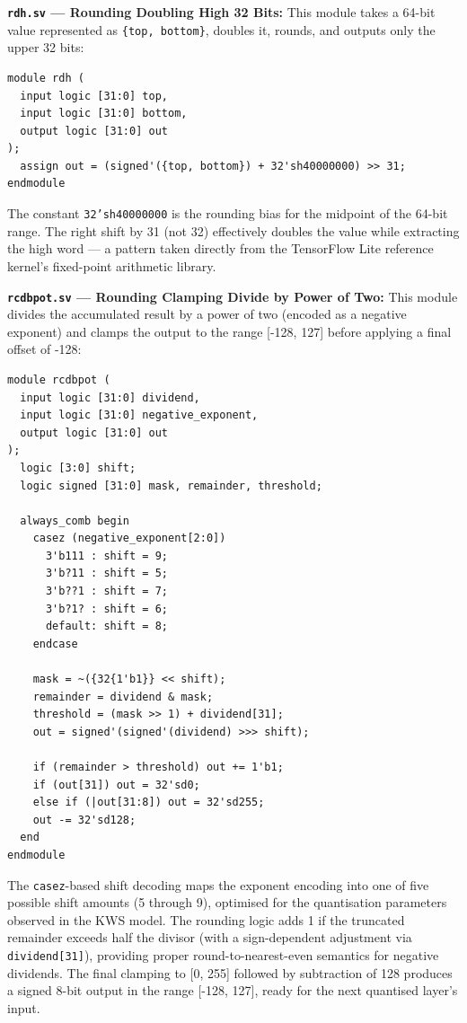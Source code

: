 \textbf{\texttt{rdh.sv} — Rounding Doubling High 32 Bits:} This module takes a 64-bit value represented as \texttt{\{top, bottom\}}, doubles it, rounds, and outputs only the upper 32 bits:

\begin{lstlisting}[style=mystyle]
module rdh (
  input logic [31:0] top,
  input logic [31:0] bottom,
  output logic [31:0] out
);
  assign out = (signed'({top, bottom}) + 32'sh40000000) >> 31;
endmodule
\end{lstlisting}

The constant \texttt{32'sh40000000} is the rounding bias for the midpoint of the 64-bit range. The right shift by 31 (not 32) effectively doubles the value while extracting the high word — a pattern taken directly from the TensorFlow Lite reference kernel's fixed-point arithmetic library.

\textbf{\texttt{rcdbpot.sv} — Rounding Clamping Divide by Power of Two:} This module divides the accumulated result by a power of two (encoded as a negative exponent) and clamps the output to the range [-128, 127] before applying a final offset of -128:

\begin{lstlisting}[style=mystyle]
module rcdbpot (
  input logic [31:0] dividend,
  input logic [31:0] negative_exponent,
  output logic [31:0] out
);
  logic [3:0] shift;
  logic signed [31:0] mask, remainder, threshold;

  always_comb begin
    casez (negative_exponent[2:0])
      3'b111 : shift = 9;
      3'b?11 : shift = 5;
      3'b??1 : shift = 7;
      3'b?1? : shift = 6;
      default: shift = 8;
    endcase

    mask = ~({32{1'b1}} << shift);
    remainder = dividend & mask;
    threshold = (mask >> 1) + dividend[31];
    out = signed'(signed'(dividend) >>> shift);

    if (remainder > threshold) out += 1'b1;
    if (out[31]) out = 32'sd0;
    else if (|out[31:8]) out = 32'sd255;
    out -= 32'sd128;
  end
endmodule
\end{lstlisting}

The \texttt{casez}-based shift decoding maps the exponent encoding into one of five possible shift amounts (5 through 9), optimised for the quantisation parameters observed in the KWS model. The rounding logic adds 1 if the truncated remainder exceeds half the divisor (with a sign-dependent adjustment via \texttt{dividend[31]}), providing proper round-to-nearest-even semantics for negative dividends. The final clamping to [0, 255] followed by subtraction of 128 produces a signed 8-bit output in the range [-128, 127], ready for the next quantised layer's input.

